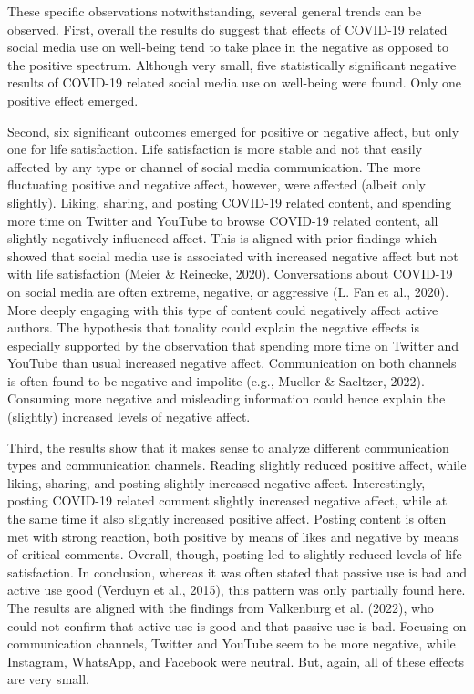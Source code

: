 \documentclass[
  man,mask,floatsintext]{apa7}
\begin{document}
These specific observations notwithstanding, several general trends can be observed.
First, overall the results do suggest that effects of COVID-19 related social media use on well-being tend to take place in the negative as opposed to the positive spectrum.
Although very small, five statistically significant negative results of COVID-19 related social media use on well-being were found.
Only one positive effect emerged.

Second, six significant outcomes emerged for positive or negative affect, but only one for life satisfaction.
Life satisfaction is more stable and not that easily affected by any type or channel of social media communication.
The more fluctuating positive and negative affect, however, were affected (albeit only slightly).
Liking, sharing, and posting COVID-19 related content, and spending more time on Twitter and YouTube to browse COVID-19 related content, all slightly negatively influenced affect.
This is aligned with prior findings which showed that social media use is associated with increased negative affect but not with life satisfaction (Meier \& Reinecke, 2020).
Conversations about COVID-19 on social media are often extreme, negative, or aggressive (L. Fan et al., 2020).
More deeply engaging with this type of content could negatively affect active authors.
The hypothesis that tonality could explain the negative effects is especially supported by the observation that spending more time on Twitter and YouTube than usual increased negative affect.
Communication on both channels is often found to be negative and impolite (e.g., Mueller \& Saeltzer, 2022).
Consuming more negative and misleading information could hence explain the (slightly) increased levels of negative affect.

Third, the results show that it makes sense to analyze different communication types and communication channels.
Reading slightly reduced positive affect, while liking, sharing, and posting slightly increased negative affect.
Interestingly, posting COVID-19 related comment slightly increased negative affect, while at the same time it also slightly increased positive affect.
Posting content is often met with strong reaction, both positive by means of likes and negative by means of critical comments.
Overall, though, posting led to slightly reduced levels of life satisfaction.
In conclusion, whereas it was often stated that passive use is bad and active use good (Verduyn et al., 2015), this pattern was only partially found here.
The results are aligned with the findings from Valkenburg et al. (2022), who could not confirm that active use is good and that passive use is bad.
Focusing on communication channels, Twitter and YouTube seem to be more negative, while Instagram, WhatsApp, and Facebook were neutral.
But, again, all of these effects are very small.
\end{document}
